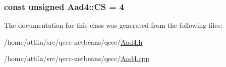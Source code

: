 \subsubsection[{\texorpdfstring{CS}{CS}}]{\setlength{\rightskip}{0pt plus 5cm}const unsigned Aad4\+::\+CS = 4\hspace{0.3cm}{\ttfamily [static]}}\hypertarget{class_aad4_a342120f0f5c7fe2240ad1de4bbda3a1b}{}\label{class_aad4_a342120f0f5c7fe2240ad1de4bbda3a1b}


The documentation for this class was generated from the following files\+:\begin{DoxyCompactItemize}
\item 
/home/attila/src/qecc-\/netbeans/qecc/\hyperlink{_aad4_8h}{Aad4.\+h}\item 
/home/attila/src/qecc-\/netbeans/qecc/\hyperlink{_aad4_8cpp}{Aad4.\+cpp}\end{DoxyCompactItemize}

